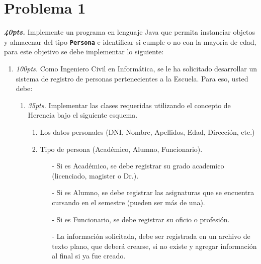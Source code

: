 \documentclass{exam}
\begin{document}
\section{\textbf{Problema 1}}
\noindent
\begin{questions}
\item \textbf{\emph{40pts.}} Implemente un programa en lenguaje Java
  que permita instanciar objetos y almacenar del tipo \texttt{\textbf{Persona}} e
  identificar si cumple o no con la mayoria de edad, para este
  objetivo se debe implementar lo siguiente:

  \begin{enumerate}
    \item \emph{100pts.} Como Ingeniero Civil en Inform\'atica, se le ha solicitado desarrollar un sistema de registro de personas pertenecientes a la Escuela. Para eso, usted debe:
    \begin{enumerate}
        \item \emph{35pts.} Implementar las clases requeridas utilizando el concepto de Herencia bajo el siguiente esquema.
        \begin{enumerate}
            \item Los datos personales (DNI, Nombre, Apellidos, Edad, Direcci\'on, etc.)
            \item Tipo de persona (Acad\'emico, Alumno, Funcionario).
            \begin{itemize}
                \item[-] Si es Acad\'emico, se debe registrar su grado academico (licenciado, magister o Dr.).
                \item[-] Si es Alumno, se debe registrar las asignaturas que se encuentra cursando en el semestre (pueden ser m\'as de una).
                \item[-] Si es Funcionario, se debe registrar su oficio o profesión.
                \item[-] La informaci\'on solicitada, debe ser registrada en un archivo de texto plano, que deber\'a crearse, si no existe y agregar informaci\'on al final si ya fue creado.
            \end{itemize}


\end{enumerate}
\end{enumerate}
\end{enumerate}
\end{questions}
\end{document}
